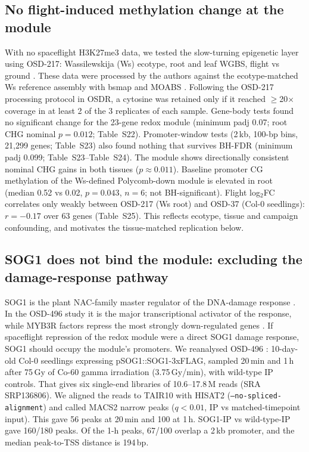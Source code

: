 \documentclass[11pt,a4paper]{article}
\newcommand{\Sx}[1]{Table~S#1}
\begin{document}
\subsection{No flight-induced methylation change at the module}

With no spaceflight H3K27me3 data, we tested the slow-turning epigenetic layer using
OSD-217: Wassilewskija (Ws) ecotype, root and leaf WGBS, flight vs ground \citep{zhou2019epigenomics}. These
data were processed by the authors against the ecotype-matched Ws reference assembly with bsmap and MOABS
\citep{zhou2019epigenomics,xi2009bsmap,sun2014moabs}. Following the OSD-217 processing protocol in OSDR, a cytosine was
retained only if it reached $\ge$20$\times$ coverage in at least 2 of the 3 replicates of each sample. Gene-body tests found no significant change for the 23-gene redox module (minimum padj 0.07;
root CHG nominal $p=0.012$; \Sx{22}). Promoter-window tests (2\,kb, 100-bp bins, 21,299 genes; \Sx{23}) also found nothing that
survives BH-FDR (minimum padj 0.099; \Sx{23}--\Sx{24}). The module shows directionally
consistent nominal CHG gains in both tissues ($p\approx0.011$). Baseline promoter CG
methylation of the Ws-defined Polycomb-down module is elevated in root (median 0.52 vs
0.02, $p=0.043$, $n=6$; not BH-significant). Flight log$_2$FC correlates only weakly between OSD-217
(Ws root) and OSD-37 (Col-0 seedlings): $r=-0.17$ over 63 genes (\Sx{25}). This reflects
ecotype, tissue and campaign confounding, and motivates the tissue-matched replication below.

\subsection{SOG1 does not bind the module: excluding the damage-response pathway}

SOG1 is the plant NAC-family master regulator of the DNA-damage response
\citep{yoshiyama2009sog1}. In the OSD-496 study it is the major transcriptional activator of the response, while
MYB3R factors repress the most strongly down-regulated genes \citep{bourbousse2018sog1}. If spaceflight repression of the
redox module were a direct SOG1 damage response, SOG1 should occupy the module's promoters. We reanalysed OSD-496 \citep{bourbousse2018sog1}:
10-day-old Col-0 seedlings expressing pSOG1::SOG1-3xFLAG, sampled 20\,min and 1\,h after 75\,Gy of Co-60 gamma
irradiation (3.75\,Gy/min), with wild-type IP controls. That gives six single-end libraries of 10.6--17.8\,M reads (SRA SRP136806). We aligned the reads to TAIR10
with HISAT2 \citep{kim2019hisat2} (\texttt{--no-spliced-alignment}) and called MACS2 \citep{zhang2008macs}
narrow peaks ($q<0.01$, IP vs matched-timepoint input). This gave 56 peaks at 20\,min and 100 at 1\,h.
SOG1-IP vs wild-type-IP gave 160/180 peaks. Of the 1-h peaks, 67/100 overlap a 2\,kb promoter, and the median
peak-to-TSS distance is 194\,bp.
\end{document}
